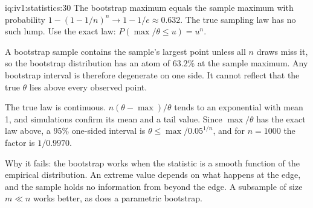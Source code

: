 \begin{solution}{iq:iv1:statistics:30}
The bootstrap maximum equals the sample maximum with probability $1 - (1 - 1/n)^n \to 1 - 1/e \approx 0.632$. The true sampling law has no such lump. Use the exact law: $P(\max/\theta \le u) = u^n$.

A bootstrap sample contains the sample's largest point unless all $n$ draws miss it, so the bootstrap distribution has an atom of $63.2\%$ at the sample maximum. Any bootstrap interval is therefore degenerate on one side. It cannot reflect that the true $\theta$ lies above every observed point.

The true law is continuous. $n(\theta - \max)/\theta$ tends to an exponential with mean 1, and simulations confirm its mean and a tail value. Since $\max/\theta$ has the exact law above, a 95\% one-sided interval is $\theta \le \max/0.05^{1/n}$, and for $n = 1000$ the factor is $1/0.9970$.

Why it fails: the bootstrap works when the statistic is a smooth function of the empirical distribution. An extreme value depends on what happens at the edge, and the sample holds no information from beyond the edge. A subsample of size $m \ll n$ works better, as does a parametric bootstrap.

\end{solution}

